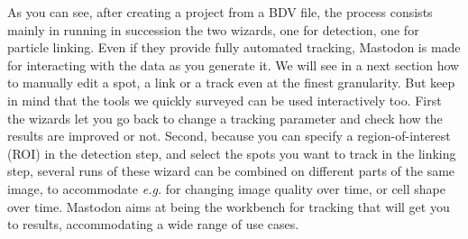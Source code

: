 As you can see, after creating a project from a BDV file, the process consists mainly in running in succession the two wizards, one for detection, one for particle linking. 
Even if they provide fully automated tracking, Mastodon is made for interacting with the data as you generate it. 
We will see in a next section how to manually edit a spot, a link or a track even at the finest granularity.
But keep in mind that the tools we quickly surveyed can be used interactively too. 
First the wizards let you go back to change a tracking parameter and check how the results are improved or not. 
Second, because you can specify a region-of-interest (ROI) in the detection step, and select the spots you want to track in the linking step, several runs of these wizard can be combined on different parts of the same image, to accommodate \textit{e.g.} for changing image quality over time, or cell shape over time. 
Mastodon aims at being the workbench for tracking that will get you to results, accommodating a wide range of use cases.
